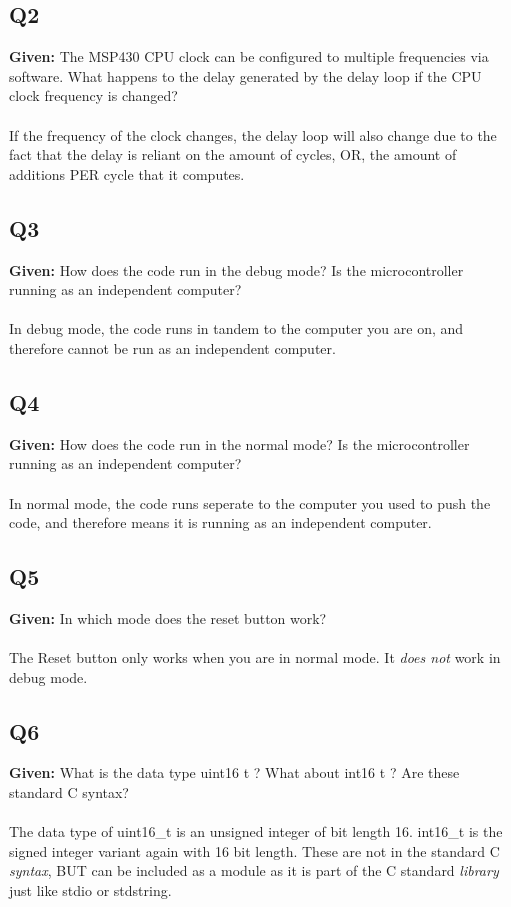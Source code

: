 \documentclass{article}
\begin{document}
\subsection{Q2}
\textbf{Given: } The MSP430 CPU clock can be configured to multiple frequencies via software. What happens to the delay generated by the delay loop if the CPU clock frequency is changed?
\\
\\
If the frequency of the clock changes, the delay loop will also change due to the fact that the delay is reliant on the amount of cycles, OR, the amount of additions PER cycle that it computes.

\subsection{Q3}
\textbf{Given: } How does the code run in the debug mode? Is the microcontroller running as an independent computer?
\\
\\
In debug mode, the code runs in tandem to the computer you are on, and therefore cannot be run as an independent computer.

\subsection{Q4}
\textbf{Given: } How does the code run in the normal mode? Is the microcontroller running as an independent computer?
\\
\\
In normal mode, the code runs seperate to the computer you used to push the code, and therefore means it is running as an independent computer.

\subsection{Q5}
\textbf{Given: } In which mode does the reset button work?
\\
\\
The Reset button only works when you are in normal mode. It \textit{does not} work in debug mode.

\subsection{Q6}
\textbf{Given: } What is the data type uint16 t ? What about int16 t ? Are these standard C syntax?
\\
\\
The data type of uint16\_t is an unsigned integer of bit length 16. int16\_t is the signed integer variant again with 16 bit length. These are not in the standard C \textit{syntax}, BUT can be included as a module as it is part of the C standard \textit{library} just like stdio or stdstring.
\end{document}
